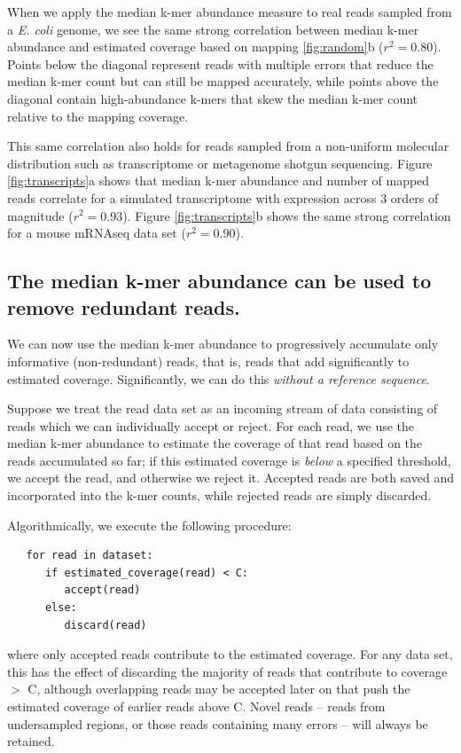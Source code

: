 \documentclass[10pt]{article}
\begin{document}
When we apply the median k-mer abundance measure to real reads sampled
from a {\em E. coli} genome, we see the same strong correlation
between median k-mer abundance and estimated coverage based on mapping
\ref{fig:random}b ($r^2=0.80$).  Points below the diagonal represent
reads with multiple errors that reduce the median k-mer count but can
still be mapped accurately, while points above the diagonal contain
high-abundance k-mers that skew the median k-mer count relative to
the mapping coverage.

This same correlation also holds for reads sampled from a non-uniform
molecular distribution such as transcriptome or metagenome shotgun
sequencing.  Figure \ref{fig:transcripts}a shows that median k-mer
abundance and number of mapped reads correlate for a simulated
transcriptome with expression across 3 orders of magnitude ($r^2 =
0.93$).  Figure \ref{fig:transcripts}b shows the same strong
correlation for a mouse mRNAseq data set ($r^2 = 0.90$).

\subsection*{The median k-mer abundance can be used to remove redundant reads.}

We can now use the median k-mer abundance to progressively accumulate
only informative (non-redundant) reads, that is, reads that add
significantly to estimated coverage.  Significantly, we can do this
{\em without a reference sequence}.

Suppose we treat the read data set as an incoming stream of data
consisting of reads which we can individually accept or reject.  For
each read, we use the median k-mer abundance to estimate the coverage
of that read based on the reads accumulated so far; if this estimated
coverage is {\em below} a specified threshold, we accept the read, and
otherwise we reject it.  Accepted reads are both saved and
incorporated into the k-mer counts, while rejected reads are simply
discarded.

Algorithmically, we execute the following procedure:

\begin{verbatim}
   for read in dataset:
      if estimated_coverage(read) < C:
         accept(read)
      else:
         discard(read)
\end{verbatim}

where only accepted reads contribute to the estimated coverage.  For
any data set, this has the effect of discarding the majority of reads
that contribute to coverage $>$ C, although overlapping reads may be
accepted later on that push the estimated coverage of earlier reads
above C.  Novel reads -- reads from undersampled regions, or those
reads containing many errors -- will always be retained.
\end{document}
